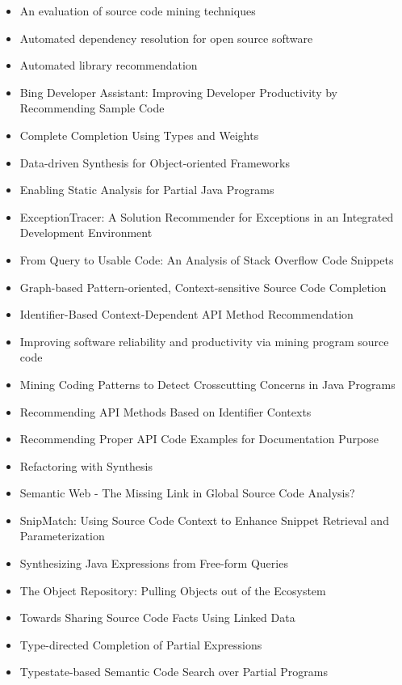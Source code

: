 \begin{itemize}
\item An evaluation of source code mining techniques
\item Automated dependency resolution for open source software
\item Automated library recommendation
\item Bing Developer Assistant: Improving Developer Productivity by Recommending Sample Code
\item Complete Completion Using Types and Weights
\item Data-driven Synthesis for Object-oriented Frameworks
\item Enabling Static Analysis for Partial Java Programs
\item ExceptionTracer: A Solution Recommender for Exceptions in an Integrated Development Environment
\item From Query to Usable Code: An Analysis of Stack Overflow Code Snippets
\item Graph-based Pattern-oriented, Context-sensitive Source Code Completion
\item Identifier-Based Context-Dependent API Method Recommendation
\item Improving software reliability and productivity via mining program source code
\item Mining Coding Patterns to Detect Crosscutting Concerns in Java Programs
\item Recommending API Methods Based on Identifier Contexts
\item Recommending Proper API Code Examples for Documentation Purpose
\item Refactoring with Synthesis
\item Semantic Web - The Missing Link in Global Source Code Analysis?
\item SnipMatch: Using Source Code Context to Enhance Snippet Retrieval and Parameterization
\item Synthesizing Java Expressions from Free-form Queries
\item The Object Repository: Pulling Objects out of the Ecosystem
\item Towards Sharing Source Code Facts Using Linked Data
\item Type-directed Completion of Partial Expressions
\item Typestate-based Semantic Code Search over Partial Programs
\end{itemize}


